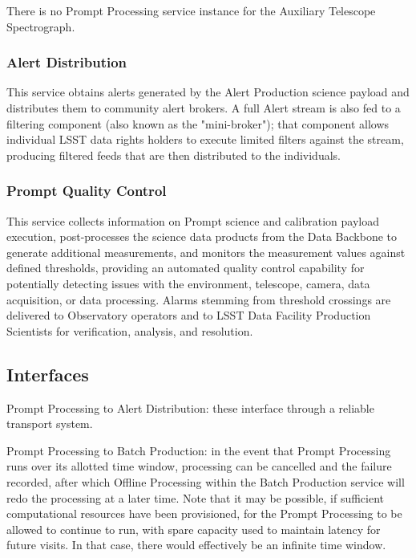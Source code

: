 \documentclass[DM,toc,lsstdraft]{lsstdoc}
\begin{document}
There is no Prompt Processing service instance for the Auxiliary
Telescope Spectrograph.

\subsubsection{Alert Distribution}\label{alert-distribution}

This service obtains alerts generated by the Alert Production science payload and distributes them to community alert brokers.
A full Alert stream is also fed to a filtering component (also known as the "mini-broker"); that component allows individual LSST data rights holders to execute limited filters against the stream, producing filtered feeds that are then distributed to the individuals.

\subsubsection{Prompt Quality Control}\label{prompt-quality-control}

This service collects information on Prompt science and calibration
payload execution, post-processes the science data products from the
Data Backbone to generate additional measurements, and monitors the
measurement values against defined thresholds, providing an automated
quality control capability for potentially detecting issues with the
environment, telescope, camera, data acquisition, or data processing.
Alarms stemming from threshold crossings are delivered to Observatory
operators and to LSST Data Facility Production Scientists for
verification, analysis, and resolution.

\subsection{Interfaces}\label{prompt-us-interfaces}

Prompt Processing to Alert Distribution: these
interface through a reliable transport system.

Prompt Processing to Batch Production: in the event that Prompt
Processing runs over its allotted time window, processing can be
cancelled and the failure recorded, after which Offline Processing within
the Batch Production service will
redo the processing at a later time. Note that it may be possible, if
sufficient computational resources have been provisioned, for the Prompt
Processing to be allowed to continue to run, with spare capacity used to
maintain latency for future visits. In that case, there would
effectively be an infinite time window.
\end{document}
